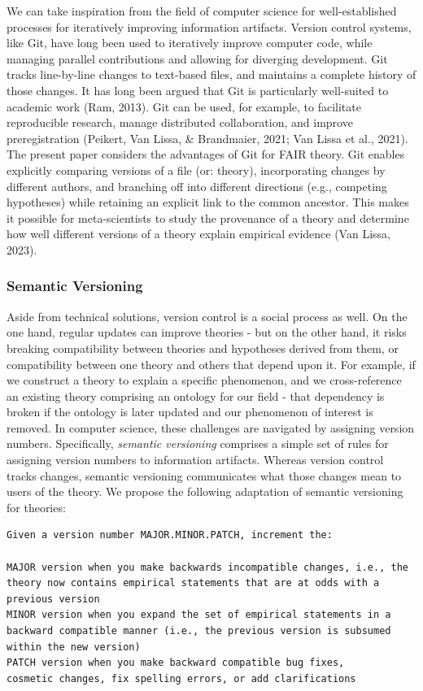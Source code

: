 \documentclass[
  man,floatsintext]{apa6}
\begin{document}
We can take inspiration from the field of computer science for well-established processes for iteratively improving information artifacts.
Version control systems, like Git, have long been used to iteratively improve computer code, while managing parallel contributions and allowing for diverging development.
Git tracks line-by-line changes to text-based files,
and maintains a complete history of those changes.
It has long been argued that Git is particularly well-suited to academic work (Ram, 2013).
Git can be used, for example, to facilitate reproducible research, manage distributed collaboration, and improve preregistration (Peikert, Van Lissa, \& Brandmaier, 2021; Van Lissa et al., 2021).
The present paper considers the advantages of Git for FAIR theory.
Git enables explicitly comparing versions of a file (or: theory),
incorporating changes by different authors,
and branching off into different directions (e.g., competing hypotheses) while retaining an explicit link to the common ancestor.
This makes it possible for meta-scientists to study the provenance of a theory and determine how well different versions of a theory explain empirical evidence (Van Lissa, 2023).

\subsubsection{Semantic Versioning}\label{semantic-versioning}

Aside from technical solutions, version control is a social process as well.
On the one hand, regular updates can improve theories - but on the other hand, it risks breaking compatibility between theories and hypotheses derived from them, or compatibility between one theory and others that depend upon it.
For example, if we construct a theory to explain a specific phenomenon, and we cross-reference an existing theory comprising an ontology for our field - that dependency is broken if the ontology is later updated and our phenomenon of interest is removed.
In computer science, these challenges are navigated by assigning version numbers.
Specifically, \emph{semantic versioning} comprises a simple set of rules for assigning version numbers to information artifacts.
Whereas version control tracks changes,
semantic versioning communicates what those changes mean to users of the theory.
We propose the following adaptation of semantic versioning for theories:

\begin{verbatim}
Given a version number MAJOR.MINOR.PATCH, increment the:

MAJOR version when you make backwards incompatible changes, i.e., the theory now contains empirical statements that are at odds with a previous version
MINOR version when you expand the set of empirical statements in a backward compatible manner (i.e., the previous version is subsumed within the new version)
PATCH version when you make backward compatible bug fixes,
cosmetic changes, fix spelling errors, or add clarifications
\end{verbatim}
\end{document}
